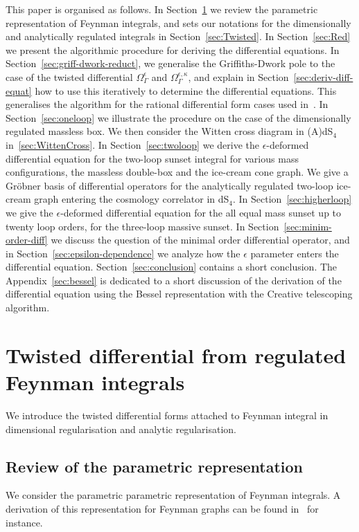 \documentclass[a4paper,12pt]{article}
\numberwithin{equation}{section}
\numberwithin{figure}{section}
\begin{document}
This paper is organised as follows. 
In Section~\ref{sec:parametric} we review the parametric
representation of Feynman integrals, and sets our notations for the 
dimensionally and analytically regulated integrals in Section~\ref{sec:Twisted}.
In Section~\ref{sec:Red} we
present the algorithmic procedure for deriving the differential
equations. In Section~\ref{sec:griff-dwork-reduct},  we generalise the
Griffiths-Dwork pole to the case of the twisted differential
$\Omega_\Gamma^\epsilon$ and $\Omega_\Gamma^{\epsilon,\kappa}$, and explain in
Section~\ref{sec:deriv-diff-equat} how to use this iteratively to
determine the differential equations. This generalises the algorithm  for the rational differential form cases
used in~\cite{Lairez:2022zkj}. In Section~\ref{sec:oneloop} we
illustrate the procedure on the case of the dimensionally regulated massless box.
We then consider the Witten cross diagram in (A)dS$_4$ in~\ref{sec:WittenCross}.
In
Section~\ref{sec:twoloop} we derive the $\epsilon$-deformed
differential equation for the two-loop sunset integral for various
mass configurations, the massless double-box and the ice-cream cone
graph. We give a Gr\"obner basis of differential operators for the
analytically regulated
two-loop ice-cream graph entering the cosmology correlator in dS$_4$. In Section~\ref{sec:higherloop} we give the $\epsilon$-deformed
differential
equation for the all equal mass sunset up to twenty loop orders, for
the three-loop massive sunset.
In Section~\ref{sec:minim-order-diff}
we discuss the question of the minimal order differential operator,
and in Section~\ref{sec:epsilon-dependence} we analyze how the
$\epsilon$ parameter enters the differential
equation. Section~\ref{sec:conclusion} contains a short
conclusion. The Appendix~\ref{sec:bessel} is dedicated to a short
discussion of the derivation of the differential equation using the
Bessel representation with the Creative telescoping algorithm.

\section{Twisted differential from regulated Feynman integrals}
\label{sec:parametric}

We introduce the twisted differential forms attached to Feynman
integral in dimensional regularisation and analytic regularisation.

\subsection{Review of the parametric representation}
We consider the parametric parametric representation of Feynman
integrals. A derivation of this representation for Feynman 
graphs can be found in~\cite{nakanishi1971graph,Vanhove:2014wqa,Bogner:2010kv,Weinzierl:2022eaz} for instance. 
\end{document}

